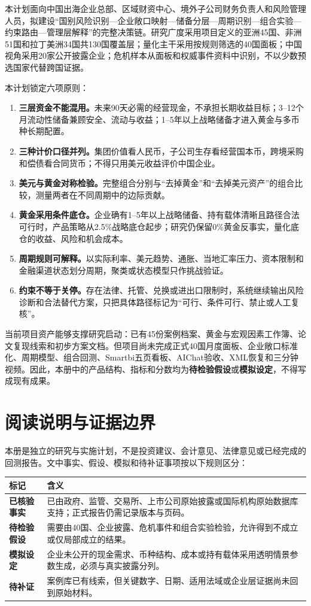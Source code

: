 \documentclass[UTF8,fontset=windows,12pt,openany]{ctexbook}
\newcommand{\StatusFact}{\textcolor{DeepNavy}{\textbf{已核验事实}}}
\newcommand{\StatusHyp}{\textcolor{GoldLine}{\textbf{待检验假设}}}
\newcommand{\StatusSim}{\textcolor{OceanBlue}{\textbf{模拟设定}}}
\newcommand{\StatusPending}{\textcolor{TextGray}{\textbf{待补证}}}
\begin{document}
本计划面向中国出海企业总部、区域财资中心、境外子公司财务负责人和风险管理人员，拟建设“国别风险识别—企业敞口映射—储备分层—周期识别—组合实验—约束路由—管理层解释”的完整决策链。研究广度采用项目定义的亚洲45国、非洲51国和拉丁美洲34国共130国覆盖层；量化主干采用按规则筛选的40国面板；中国视角采用20家公开披露企业；危机样本从面板和权威事件资料中识别，不以少数预选国家代替跨国证据。

本计划锁定六项原则：

\begin{enumerate}
  \item \textbf{三层资金不能混用。}未来90天必需的经营现金，不承担长期收益目标；3--12个月流动性储备兼顾安全、流动与收益；1--5年以上战略储备才进入黄金与多币种长期配置。
  \item \textbf{三种计价口径并列。}集团价值看人民币，子公司生存看经营国本币，跨境采购和偿债看合同货币；不得只用美元收益评价中国企业。
  \item \textbf{美元与黄金对称检验。}完整组合分别与“去掉黄金”和“去掉美元资产”的组合比较，测量两者在不同周期中的边际贡献。
  \item \textbf{黄金采用条件底仓。}企业确有1--5年以上战略储备、持有载体清晰且路径合法可行时，产品策略从2.5\%战略底仓起步；研究仍保留0\%黄金反事实，量化底仓的收益、风险和机会成本。
  \item \textbf{周期规则可解释。}以实际利率、美元趋势、通胀、当地汇率压力、资本限制和金融渠道状态划分周期，聚类或状态模型只作挑战验证。
  \item \textbf{约束不等于关停。}存在法律、托管、兑换或进出口限制时，系统继续输出风险诊断和合法替代方案，只把具体路径标记为“可行、条件可行、禁止或人工复核”。
\end{enumerate}

当前项目资产能够支撑研究启动：已有45份案例档案、黄金与宏观因素工作簿、论文复现线索和初步方案文档。但项目尚未完成正式40国月度面板、企业敞口标准化、周期模型、组合回测、Smartbi五页看板、AIChat验收、XML恢复和三分钟视频。因此，本册中的产品结构、指标和分数均为\StatusHyp 或\StatusSim，不得写成现有成果。

\chapter*{阅读说明与证据边界}

本册是独立的研究与实施计划，不是投资建议、会计意见、法律意见或已经完成的回测报告。文中事实、假设、模拟和待补证事项按以下规则区分：

\begin{longtable}{p{2.6cm}p{10.8cm}}
\toprule
\textbf{标记} & \textbf{含义}\\
\midrule
\StatusFact & 已由政府、监管、交易所、上市公司原始披露或国际机构原始数据库支持；正式报告仍需记录版本与页码。\\
\StatusHyp & 需要由40国、企业披露、危机事件和组合实验检验，允许得到不成立或仅局部成立的结果。\\
\StatusSim & 企业未公开的现金需求、币种结构、成本或持有载体采用透明情景参数生成，必须与真实披露分列。\\
\StatusPending & 案例库已有线索，但关键数字、日期、适用法域或企业层证据尚未回到原始材料。\\
\bottomrule
\end{longtable}
\end{document}
